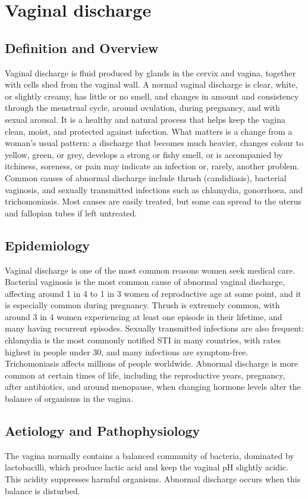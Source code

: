 \chapter{Vaginal discharge}

\section*{Definition and Overview}
Vaginal discharge is fluid produced by glands in the cervix and vagina, together with cells shed from the vaginal wall. A normal vaginal discharge is clear, white, or slightly creamy, has little or no smell, and changes in amount and consistency through the menstrual cycle, around ovulation, during pregnancy, and with sexual arousal. It is a healthy and natural process that helps keep the vagina clean, moist, and protected against infection. What matters is a change from a woman's usual pattern: a discharge that becomes much heavier, changes colour to yellow, green, or grey, develops a strong or fishy smell, or is accompanied by itchiness, soreness, or pain may indicate an infection or, rarely, another problem. Common causes of abnormal discharge include thrush (candidiasis), bacterial vaginosis, and sexually transmitted infections such as chlamydia, gonorrhoea, and trichomoniasis. Most causes are easily treated, but some can spread to the uterus and fallopian tubes if left untreated.

\section*{Epidemiology}
Vaginal discharge is one of the most common reasons women seek medical care. Bacterial vaginosis is the most common cause of abnormal vaginal discharge, affecting around 1 in 4 to 1 in 3 women of reproductive age at some point, and it is especially common during pregnancy. Thrush is extremely common, with around 3 in 4 women experiencing at least one episode in their lifetime, and many having recurrent episodes. Sexually transmitted infections are also frequent: chlamydia is the most commonly notified STI in many countries, with rates highest in people under 30, and many infections are symptom-free. Trichomoniasis affects millions of people worldwide. Abnormal discharge is more common at certain times of life, including the reproductive years, pregnancy, after antibiotics, and around menopause, when changing hormone levels alter the balance of organisms in the vagina.

\section*{Aetiology and Pathophysiology}
The vagina normally contains a balanced community of bacteria, dominated by lactobacilli, which produce lactic acid and keep the vaginal pH slightly acidic. This acidity suppresses harmful organisms. Abnormal discharge occurs when this balance is disturbed.

